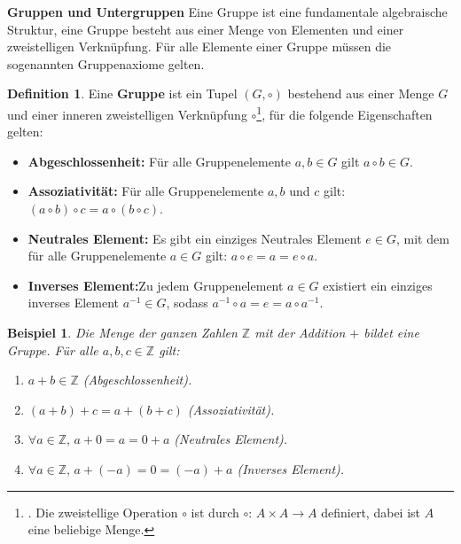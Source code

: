 \documentclass[12pt,oneside]{article}
\newtheorem{example}[theorem]{Beispiel}
\theoremstyle{remark}
\theoremstyle{definition}
\newtheorem{definition}{Definition}[section]
\begin{document}
\textbf{Gruppen und Untergruppen}\newline
Eine Gruppe ist eine fundamentale algebraische Struktur, eine Gruppe besteht aus einer Menge von Elementen und einer zweistelligen Verknüpfung. Für alle Elemente einer Gruppe müssen die sogenannten Gruppenaxiome gelten.   
\begin{definition}
Eine \textbf{Gruppe} ist ein Tupel $(G, \circ)$ bestehend aus einer Menge $G$ und einer inneren zweistelligen Verknüpfung $\circ$\footnote{. Die zweistellige Operation $\circ$ ist durch $\circ: \, A \times A \to A$ definiert, dabei ist $A$ eine beliebige Menge.}, für die folgende Eigenschaften gelten:
\begin{itemize}
    \item \textbf{Abgeschlossenheit:} Für alle Gruppenelemente $a,b \in G$ gilt $a \circ b \in G$.\newline
    
    \item \textbf{Assoziativität:} Für alle Gruppenelemente $a,b$ und $c$ gilt:\newline
    $(a \circ b) \circ c = a \circ (b \circ c)$.\newline
    \item \textbf{Neutrales Element:} Es gibt ein einziges Neutrales Element $e \in G$, mit dem für alle Gruppenelemente $a \in G$ gilt:\newline
    $a \circ e = a = e \circ a$.\newline
    \item \textbf{Inverses Element:}Zu jedem Gruppenelement $a \in G$ existiert ein einziges inverses Element $a^{-1} \in G$, sodass 
    $a^{-1} \circ a  = e = a \circ a^{-1}$.\newline
\end{itemize}
\end{definition}

\smallskip

\begin{example}
Die Menge der ganzen Zahlen $\mathbb{Z}$ mit der Addition $+$ bildet eine Gruppe.
Für alle $a,b,c \in \mathbb{Z}$ gilt:
\begin{enumerate}
    \item $a + b \in \mathbb{Z}$ (Abgeschlossenheit).\newline
    
    \item $(a + b) + c = a + (b + c)$ (Assoziativität).\newline
    
    \item $\forall a \in \mathbb{Z}, \, a + 0 = a = 0 + a$ (Neutrales Element).\newline
    
    \item $\forall a \in \mathbb{Z}, \, a + (-a) = 0 = (-a) + a$ (Inverses Element).
\end{enumerate}
\end{example}
\end{document}

